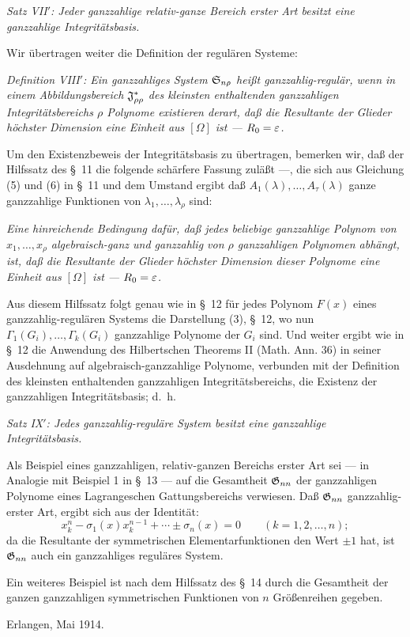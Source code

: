 \emph{Satz VII$'$: Jeder ganzzahlige relativ-ganze Bereich erster Art besitzt eine ganzzahlige Integritätsbasis.}

Wir übertragen weiter die Definition der regulären Systeme:

\emph{Definition VIII$'$: Ein ganzzahliges System $\mathfrak{S}_{n\rho}$ heißt ganzzahlig-regulär, wenn in einem Abbildungsbereich $\mathfrak{J}^*_{\rho\rho}$ des kleinsten enthaltenden ganzzahligen Integritätsbereichs $\rho$ Polynome existieren derart, daß die Resultante der Glieder höchster Dimension eine Einheit aus $[\Omega]$ ist --- $R_0=\varepsilon$.}

Um den Existenzbeweis der Integritätsbasis zu übertragen, bemerken wir, daß der Hilfssatz des \S\ 11 die folgende schärfere Fassung zuläßt ---, die sich aus Gleichung (5) und (6) in \S\ 11 und dem Umstand ergibt daß $A_1(\lambda),
\ldots,A_\tau(\lambda)$ ganze ganzzahlige Funktionen von $\lambda_1,
\ldots,
\lambda_\rho$ sind:

\emph{Eine hinreichende Bedingung dafür, daß jedes beliebige ganzzahlige Polynom von $x_1,
\ldots,x_\rho$ algebraisch-ganz und ganzzahlig von $\rho$ ganzzahligen Polynomen abhängt, ist, daß die Resultante der Glieder höchster Dimension dieser Polynome eine Einheit aus $[\Omega]$ ist --- $R_0=\varepsilon$.}

Aus diesem Hilfssatz folgt genau wie in \S\ 12 für jedes Polynom $F(x)$ eines ganzzahlig-regulären Systems die Darstellung (3), \S\ 12, wo nun $\Gamma_1(G_i),
\ldots,
\Gamma_k(G_i)$ ganzzahlige Polynome der $G_i$ sind. Und weiter ergibt wie in \S\ 12 die Anwendung des Hilbertschen Theorems II (Math. Ann. 36) in seiner Ausdehnung auf algebraisch-ganzzahlige Polynome, verbunden mit der Definition des kleinsten enthaltenden ganzzahligen Integritätsbereichs, die Existenz der ganzzahligen Integritätsbasis; d.~h.

\emph{Satz IX$'$: Jedes ganzzahlig-reguläre System besitzt eine ganzzahlige Integritätsbasis.}

Als Beispiel eines ganzzahligen, relativ-ganzen Bereichs erster Art sei --- in Analogie mit Beispiel 1 in \S\ 13 --- auf die Gesamtheit $\mathfrak{G}_{nn}$ der ganzzahligen Polynome eines Lagrangeschen Gattungsbereichs verwiesen. Daß $\mathfrak{G}_{nn}$ ganzzahlig-erster Art, ergibt sich aus der Identität:
\[
  x_k^n-\sigma_1(x)x_k^{n-1}+\cdots\pm\sigma_n(x)=0
  \qquad(k=1,2,
\ldots,n);
\]
da die Resultante der symmetrischen Elementarfunktionen den Wert $\pm1$ hat, ist $\mathfrak{G}_{nn}$ auch ein ganzzahliges reguläres System.

Ein weiteres Beispiel ist nach dem Hilfssatz des \S\ 14 durch die Gesamtheit der ganzen ganzzahligen symmetrischen Funktionen von $n$ Größenreihen gegeben.

Erlangen, Mai 1914.

\clearpage

